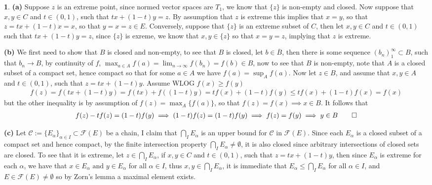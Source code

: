 \documentclass[10.5pt]{article}
\theoremstyle{definition}
\newtheorem{pb}{}
\newcommand{\set}[1]{\{#1\}}
\newcommand{\tand}{\text{ and }}
\begin{document}
    \begin{pb}
        \textbf{(a)} Suppose \(z\) is an extreme point, since normed vector spaces are \(T_1\), we know that \(\set{z}\) is non-empty and closed. Now suppose that \(x,y \in C\) and \(t \in (0,1)\), such that \(tx + (1-t)y = z\). By assumption that \(z\) is extreme this implies that \(x = y\), so that \(z = tx + (1-t)x = x\), so that \(y = x = z \in E\). Conversely, suppose that \(\set{z}\) is an extreme subset of \(C\), then let \(x,y \in C\) and \(t \in (0,1)\) such that \(tx + (1-t)y = z\), since \(\set{z}\) is exreme, we know that \(x,y\in \set{z}\) so that \(x = y = z\), implying that \(z\) is extreme.

        \textbf{(b)} We first need to show that \(B\) is closed and non-empty, to see that \(B\) is closed, let \(b \in \overline{B}\), then there is some sequence \((b_n)_1^\infty \subset B\), such that \(b_n \to B\), by continuity of \(f\), \(\max_{a \in A}f(a) = \lim_{n\to\infty}f(b_n) = f(b) \in B\), now to see that \(B\) is non-empty, note that \(A\) is a closed subset of a compact set, hence compact so that for some \(a \in A\) we have \(f(a) = \sup_Af(a)\). Now let \(z \in B\), and assume that \(x,y \in A\) and \(t \in (0,1)\), such that \(z = tx + (1-t)y\). Assume WLOG \(f(x) \geq f(y)\)
        \begin{align*}
            f(z) = f(tx + (1-t)y) = f(tx) + f((1-t)y) = tf(x) + (1-t)f(y) \leq tf(x) + (1-t)f(x) = f(x)
        \end{align*}
        but the other inequality is by assumption of \(f(z) = \max_A\set{f(a)}\), so that \(f(z) = f(x) \implies x \in B\). It follows that
        \begin{align*}
            f(z) - tf(z) = (1-t)f(y) \implies (1-t)f(z) = (1-t)f(y) \implies f(z) = f(y) \implies y \in B \qed
        \end{align*}

        \textbf{(c)} Let \(\mathcal{C} := \set{E_\alpha}_{\alpha \in I} \subset \mathcal{F}(E)\) be a chain, I claim that \(\bigcap_I E_\alpha\) is an upper bound for \(\mathcal{C}\) in \(\mathcal{F}(E)\). Since each \(E_\alpha\) is a closed subset of a compact set and hence compact, by the finite intersection property \(\bigcap_I E_\alpha \neq \emptyset\), it is also closed since arbitrary intersections of closed sets are closed. To see that it is extreme, let \(z \in \bigcap_I E_\alpha\), if \(x,y \in C\) and \(t \in (0,1)\), such that \(z = tx + (1-t)y\), then since \(E_\alpha\) is extreme for each \(\alpha\), we have that \(x \in E_\alpha \tand y \in E_\alpha\) for all \(\alpha \in I\), thus \(x,y \in \bigcap_I E_\alpha\), it is immediate that \(E_\alpha \leq \bigcap_I E_\alpha\) for all \(\alpha \in I\), and \(E \in \mathcal{F}(E) \neq \emptyset\) so by Zorn's lemma a maximal element exists.


\end{pb}
\end{document}
